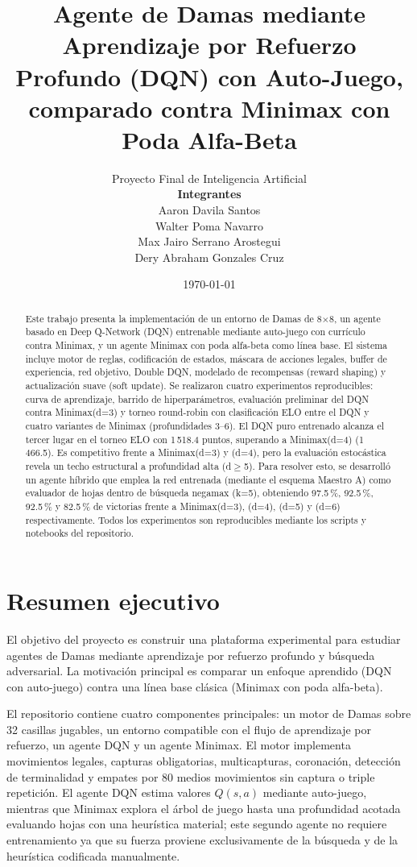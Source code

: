 \documentclass[11pt,a4paper]{article}
\title{Agente de Damas mediante Aprendizaje por Refuerzo Profundo (DQN) con Auto-Juego, comparado contra Minimax con Poda Alfa-Beta}
\author{
Proyecto Final de Inteligencia Artificial\\[0.75em]
\textbf{Integrantes}\\
Aaron Davila Santos\\
Walter Poma Navarro\\
Max Jairo Serrano Arostegui\\
Dery Abraham Gonzales Cruz
}
\date{\today}
\begin{document}
\maketitle

\begin{abstract}
Este trabajo presenta la implementación de un entorno de Damas de 8$\times$8, un agente basado en Deep Q-Network (DQN) entrenable mediante auto-juego con currículo contra Minimax, y un agente Minimax con poda alfa-beta como línea base. El sistema incluye motor de reglas, codificación de estados, máscara de acciones legales, buffer de experiencia, red objetivo, Double DQN, modelado de recompensas (reward shaping) y actualización suave (soft update). Se realizaron cuatro experimentos reproducibles: curva de aprendizaje, barrido de hiperparámetros, evaluación preliminar del DQN contra Minimax(d=3) y torneo round-robin con clasificación ELO entre el DQN y cuatro variantes de Minimax (profundidades 3--6). El DQN puro entrenado alcanza el tercer lugar en el torneo ELO con 1\,518.4 puntos, superando a Minimax(d=4) (1\,466.5). Es competitivo frente a Minimax(d=3) y (d=4), pero la evaluación estocástica revela un techo estructural a profundidad alta (d$\geq$5). Para resolver esto, se desarrolló un agente híbrido que emplea la red entrenada (mediante el esquema Maestro A) como evaluador de hojas dentro de búsqueda negamax (k=5), obteniendo 97.5\,\%, 92.5\,\%, 92.5\,\% y 82.5\,\% de victorias frente a Minimax(d=3), (d=4), (d=5) y (d=6) respectivamente. Todos los experimentos son reproducibles mediante los scripts y notebooks del repositorio.
\end{abstract}

\section{Resumen ejecutivo}

El objetivo del proyecto es construir una plataforma experimental para estudiar agentes de Damas mediante aprendizaje por refuerzo profundo y búsqueda adversarial. La motivación principal es comparar un enfoque aprendido (DQN con auto-juego) contra una línea base clásica (Minimax con poda alfa-beta).

El repositorio contiene cuatro componentes principales: un motor de Damas sobre 32 casillas jugables, un entorno compatible con el flujo de aprendizaje por refuerzo, un agente DQN y un agente Minimax. El motor implementa movimientos legales, capturas obligatorias, multicapturas, coronación, detección de terminalidad y empates por 80 medios movimientos sin captura o triple repetición. El agente DQN estima valores $Q(s,a)$ mediante auto-juego, mientras que Minimax explora el árbol de juego hasta una profundidad acotada evaluando hojas con una heurística material; este segundo agente no requiere entrenamiento ya que su fuerza proviene exclusivamente de la búsqueda y de la heurística codificada manualmente.
\end{document}

